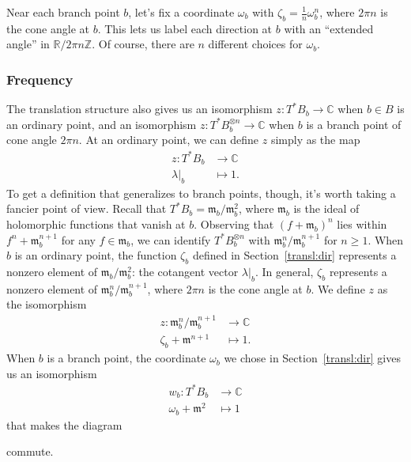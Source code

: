 \documentclass{article}
\theoremstyle{definition}
\newcommand{\maps}{\colon}
\newcommand{\Z}{\mathbb{Z}}
\newcommand{\R}{\mathbb{R}}
\newcommand{\C}{\mathbb{C}}
\newcommand{\blankbox}{{\fboxsep 0pt \colorbox{lightgray}{\phantom{$h$}}}}
\newcommand{\van}{\mathfrak{m}}
\theoremstyle{plain}
\begin{document}
Near each branch point $b$, let's fix a coordinate $\omega_b$ with $\zeta_b = \tfrac{1}{n} \omega_b^n$, where $2\pi n$ is the cone angle at $b$. This lets us label each direction at $b$ with an ``extended angle'' in $\R/2\pi n\Z$. Of course, there are $n$ different choices for $\omega_b$.
%
\subsubsection{Frequency}\label{transl-freq}
%
The translation structure also gives us an isomorphism $z \maps T^*B_b \to \C$ when $b \in B$ is an ordinary point, and an isomorphism $z \maps T^*B_b^{\otimes n} \to \C$ when $b$ is a branch point of cone angle $2\pi n$. At an ordinary point, we can define $z$ simply as the map
\begin{align*}
z \maps T^*B_b & \to \C \\
\lambda\big|_b & \mapsto 1.
\end{align*}
To get a definition that generalizes to branch points, though, it's worth taking a fancier point of view. Recall that $T^*B_b = \van_b / \van_b^2$, where $\van_b$ is the ideal of holomorphic functions that vanish at $b$. Observing that $(f + \van_b)^n$ lies within $f^n + \van_b^{n+1}$ for any $f \in \van_b$, we can identify $T^*B_b^{\otimes n}$ with $\van_b^n / \van_b^{n+1}$ for $n \ge 1$. When $b$ is an ordinary point, the function $\zeta_b$ defined in Section~\ref{transl:dir} represents a nonzero element of $\van_b / \van_b^2$: the cotangent vector $\lambda\big|_b$. In general, $\zeta_b$ represents a nonzero element of $\van_b^n / \van_b^{n+1}$, where $2\pi n$ is the cone angle at $b$. We define $z$ as the isomorphism
\begin{align*}
z \maps \van_b^n / \van_b^{n+1} & \to \C \\
\zeta_b + \van^{n+1} & \mapsto 1.
\end{align*}
When $b$ is a branch point, the coordinate $\omega_b$ we chose in Section~\ref{transl:dir} gives us an isomorphism
\begin{align*}
w_b \maps T^*B_b & \to \C \\
\omega_b + \van^2 & \mapsto 1
\end{align*}
that makes the diagram
\begin{center}
\end{center}
commute.
\end{document}
